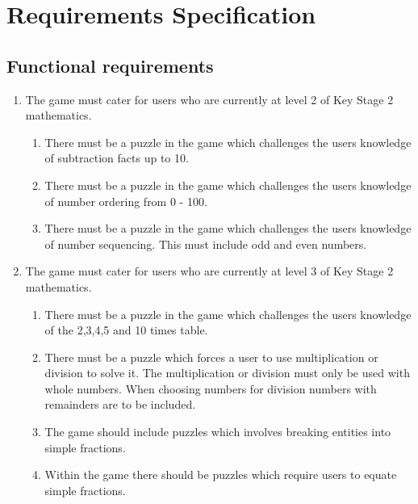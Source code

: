 \chapter{Requirements Specification}

\section{Functional requirements}
\begin{enumerate}

	\item The game must cater for users who are currently at level 2 of Key Stage 2 mathematics.
	\begin{enumerate}[label={1.\arabic*},nolistsep,leftmargin=*]
		\item There must be a puzzle in the game which challenges the users knowledge of subtraction facts up to 10.
		\item There must be a puzzle in the game which challenges the users knowledge of number ordering from 0 - 100.
		\item There must be a puzzle in the game which challenges the users knowledge of number sequencing. This must include odd and even numbers.
	\end{enumerate}

	\item The game must cater for users who are currently at level 3 of Key Stage 2 mathematics.
	\begin{enumerate}[label={2.\arabic*},nolistsep,leftmargin=*]
		\item There must be a puzzle in the game which challenges the users knowledge of the 2,3,4,5 and 10 times table.
		\item There must be a puzzle which forces a user to use multiplication or division to solve it. The multiplication or division must only be used with whole numbers. When choosing numbers for division numbers with remainders are to be included.	
		\item The game should include puzzles which involves breaking entities into simple fractions.
		\item Within the game there should be puzzles which require users to equate simple fractions.
	\end{enumerate}
	

\end{enumerate}
